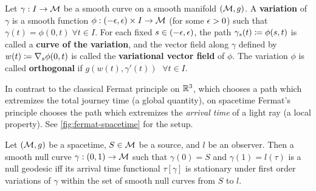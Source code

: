 \begin{definition}[]\label{def:variation}
Let $\gamma: I \to \mathcal{M}$ be a smooth curve on a smooth manifold $(\mathcal{M}, g)$. A \textbf{variation} of $\gamma$ is a smooth function $\phi: (-\epsilon, \epsilon) \times I \to \mathcal{M}$ (for some $\epsilon>0$) such that $\gamma(t) = \phi(0, t) \; \forall t \in I$. For each fixed $s\in (-\epsilon, \epsilon)$, the path $\gamma_s(t) \coloneqq \phi(s, t)$ is called a \textbf{curve of the variation}, and the vector field along $\gamma$ defined by $w(t) \coloneqq \nabla_s \phi(0, t)$ is called the \textbf{variational vector field} of $\phi$. The variation $\phi$ is called \textbf{orthogonal} if $g(w(t), \gamma'(t))$ $\; \forall t \in I$.
\end{definition}
In contrast to the classical Fermat principle on $\mathbb{R}^3$, which chooses a path which extremizes the total journey time (a global quantity), on spacetime Fermat's principle chooses the path which extremizes the \textit{arrival time} of a light ray (a local property). See \cref{fig:fermat-spacetime} for the setup.
\begin{theorem}\label{}
Let $(\mathcal{M}, g)$ be a spacetime, $S \in \mathcal{M}$ be a source, and $l$ be an observer. Then a smooth null curve $\gamma: (0,1) \to \mathcal{M}$ such that $\gamma(0) = S$ and $\gamma(1) = l(\tau)$ is a null geodesic iff its arrival time functional $\tau[\gamma]$ is stationary under first order variations of $\gamma$ within the set of smooth null curves from $S$ to $l$.
\end{theorem}
